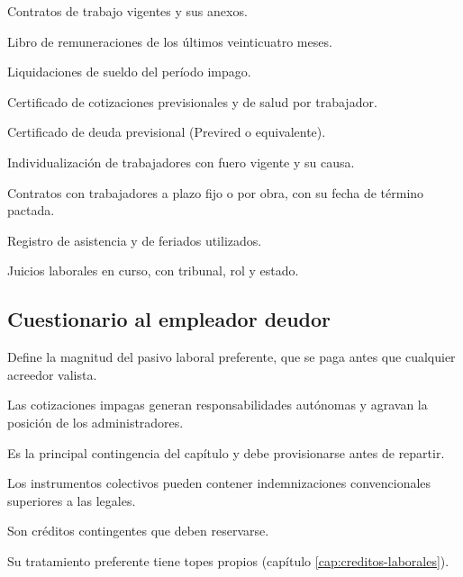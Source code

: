\begin{checklist}
  \item Contratos de trabajo vigentes y sus anexos.
  \item Libro de remuneraciones de los últimos veinticuatro meses.
  \item Liquidaciones de sueldo del período impago.
  \item Certificado de cotizaciones previsionales y de salud por trabajador.
  \item Certificado de deuda previsional (Previred o equivalente).
  \item Individualización de trabajadores con fuero vigente y su causa.
  \item Contratos con trabajadores a plazo fijo o por obra, con su fecha de término
  pactada.
  \item Registro de asistencia y de feriados utilizados.
  \item Juicios laborales en curso, con tribunal, rol y estado.
\end{checklist}

\subsection{Cuestionario al empleador deudor}

\begin{cuestionario}
  {Define la magnitud del pasivo laboral preferente, que se paga antes que cualquier
  acreedor valista.}

  {Las cotizaciones impagas generan responsabilidades autónomas y agravan la posición de
  los administradores.}

  {Es la principal contingencia del capítulo y debe provisionarse antes de repartir.}

  {Los instrumentos colectivos pueden contener indemnizaciones convencionales superiores
  a las legales.}

  {Son créditos contingentes que deben reservarse.}

  {Su tratamiento preferente tiene topes propios (capítulo \ref{cap:creditos-laborales}).}
\end{cuestionario}

